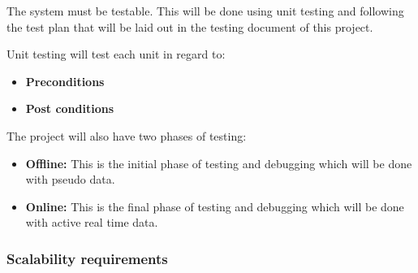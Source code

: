 \begin{flushleft}

The system must be testable. This will be done using unit testing and following the test plan that will be laid out in the testing document of this project.\\

\vspace{0.1in}

Unit testing will test each unit in regard to:
\begin{itemize}

\item\textbf{Preconditions}
\item\textbf{Post conditions}

\end{itemize}

The project will also have two phases of testing:

\begin{itemize}

\item\textbf{Offline:} This is the initial phase of testing and debugging which will be done with pseudo data.
\item\textbf{Online:} This is the final phase of testing and debugging which will be done with active real time data.

\end{itemize}

\end{flushleft}

\vspace{0.1in}

\subsubsection{Scalability requirements}

